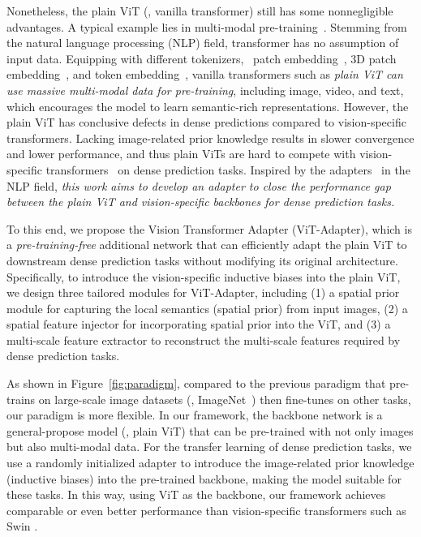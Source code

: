 \documentclass{article} \usepackage{iclr2023_conference,times}
\begin{document}
Nonetheless, the plain ViT (\ie, vanilla transformer) still has some nonnegligible advantages. 
A typical example lies in multi-modal pre-training~\citep{zhu2021uni,zhu2022uni,wang2022beit3}.
Stemming from the natural language processing (NLP) field, transformer has no assumption of input data. 
Equipping with different tokenizers, \eg~patch embedding~\citep{dosovitskiy2020image}, 3D patch embedding~\citep{liu2021video}, and token embedding~\citep{vaswani2017attention}, vanilla transformers such as \emph{plain ViT can use massive multi-modal data for pre-training}, including image, video, and text, which encourages the model to learn semantic-rich representations. 
However, the plain ViT has conclusive defects in dense predictions compared to vision-specific transformers. 
Lacking image-related prior knowledge results in slower convergence and lower performance, and thus plain ViTs are hard to compete with vision-specific transformers~\citep{huang2021shuffle,xie2021segformer,wang2021pvtv2} on dense prediction tasks.
Inspired by the adapters~\citep{houlsby2019parameter,stickland2019bert} in the NLP field, \emph{this work aims to develop an adapter to close the performance gap between the plain ViT and vision-specific backbones for dense prediction tasks.}


To this end, we propose the Vision Transformer Adapter (ViT-Adapter),
which is a \emph{pre-training-free} additional network that can efficiently adapt the plain ViT to downstream dense prediction tasks without modifying its original architecture.
Specifically, to introduce the vision-specific inductive biases into the plain ViT, we design three tailored modules for ViT-Adapter, including (1) a spatial prior module for capturing the local semantics (spatial prior) from input images, (2) a spatial feature injector for incorporating spatial prior into the ViT, and (3) a multi-scale feature extractor to reconstruct the multi-scale features required by dense prediction tasks.




As shown in Figure~\ref{fig:paradigm}, compared to the previous paradigm that pre-trains on large-scale image datasets (\eg, ImageNet~\citep{deng2009imagenet}) then fine-tunes on other tasks, our paradigm is more flexible. 
In our framework, the backbone network is a general-propose model (\eg, plain ViT) that can be pre-trained with not only images but also multi-modal data.
For the transfer learning of dense prediction tasks, we use a randomly initialized adapter to introduce the image-related prior knowledge (inductive biases) into the pre-trained backbone, making the model suitable for these tasks.
In this way, using ViT as the backbone, our framework achieves comparable or even better performance than vision-specific transformers such as Swin \citep{liu2021swin}.
\end{document}
